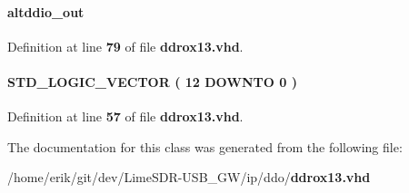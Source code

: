\paragraph[{altddio\+\_\+out\+\_\+component}]{ {\bfseries \textcolor{vhdlchar}{altddio\+\_\+out}\textcolor{vhdlchar}{ }} \hspace{0.3cm}{\ttfamily [Instantiation]}}\label{classddrox13_1_1SYN_ac64e3d97688e4ce7e7b87896d83667f4}


Definition at line {\bf 79} of file {\bf ddrox13.\+vhd}.

\paragraph[{sub\+\_\+wire0}]{ {\bfseries \textcolor{comment}{S\+T\+D\+\_\+\+L\+O\+G\+I\+C\+\_\+\+V\+E\+C\+T\+OR}\textcolor{vhdlchar}{ }\textcolor{vhdlchar}{(}\textcolor{vhdlchar}{ }\textcolor{vhdlchar}{ } \textcolor{vhdldigit}{12} \textcolor{vhdlchar}{ }\textcolor{keywordflow}{D\+O\+W\+N\+TO}\textcolor{vhdlchar}{ }\textcolor{vhdlchar}{ } \textcolor{vhdldigit}{0} \textcolor{vhdlchar}{ }\textcolor{vhdlchar}{)}\textcolor{vhdlchar}{ }} \hspace{0.3cm}{\ttfamily [Signal]}}\label{classddrox13_1_1SYN_a568529a9643547f2c969a1c28ef66810}


Definition at line {\bf 57} of file {\bf ddrox13.\+vhd}.



The documentation for this class was generated from the following file\+:\begin{DoxyCompactItemize}
\item 
/home/erik/git/dev/\+Lime\+S\+D\+R-\/\+U\+S\+B\+\_\+\+G\+W/ip/ddo/{\bf ddrox13.\+vhd}\end{DoxyCompactItemize}
